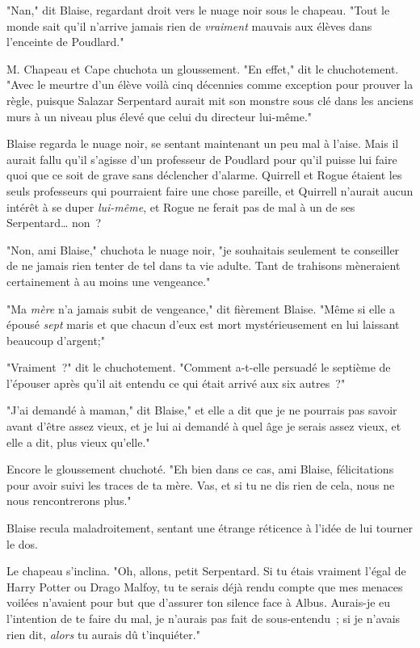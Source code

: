 "Nan," dit Blaise, regardant droit vers le nuage noir sous le chapeau. "Tout le monde sait qu'il n'arrive jamais rien de \emph{vraiment} mauvais aux élèves dans l'enceinte de Poudlard."

M. Chapeau et Cape chuchota un gloussement. "En effet," dit le chuchotement. "Avec le meurtre d'un élève voilà cinq décennies comme exception pour prouver la règle, puisque Salazar Serpentard aurait mit son monstre sous clé dans les anciens murs à un niveau plus élevé que celui du directeur lui-même."

Blaise regarda le nuage noir, se sentant maintenant un peu mal à l'aise. Mais il aurait fallu qu'il s'agisse d'un professeur de Poudlard pour qu'il puisse lui faire quoi que ce soit de grave sans déclencher d'alarme. Quirrell et Rogue étaient les seuls professeurs qui pourraient faire une chose pareille, et Quirrell n'aurait aucun intérêt à se duper \emph{lui-même}, et Rogue ne ferait pas de mal à un de ses Serpentard… non~?

"Non, ami Blaise," chuchota le nuage noir, "je souhaitais seulement te conseiller de ne jamais rien tenter de tel dans ta vie adulte. Tant de trahisons mèneraient certainement à au moins une vengeance."

"Ma \emph{mère} n'a jamais subit de vengeance," dit fièrement Blaise. "Même si elle a épousé \emph{sept} maris et que chacun d'eux est mort mystérieusement en lui laissant beaucoup d'argent;"

"Vraiment~?" dit le chuchotement. "Comment a-t-elle persuadé le septième de l'épouser après qu'il ait entendu ce qui était arrivé aux six autres~?"

"J'ai demandé à maman," dit Blaise," et elle a dit que je ne pourrais pas savoir avant d'être assez vieux, et je lui ai demandé à quel âge je serais assez vieux, et elle a dit, plus vieux qu'elle."

Encore le gloussement chuchoté. "Eh bien dans ce cas, ami Blaise, félicitations pour avoir suivi les traces de ta mère. Vas, et si tu ne dis rien de cela, nous ne nous rencontrerons plus."

Blaise recula maladroitement, sentant une étrange réticence à l'idée de lui tourner le dos.

Le chapeau s'inclina. "Oh, allons, petit Serpentard. Si tu étais vraiment l'égal de Harry Potter ou Drago Malfoy, tu te serais déjà rendu compte que mes menaces voilées n'avaient pour but que d'assurer ton silence face à Albus. Aurais-je eu l'intention de te faire du mal, je n'aurais pas fait de sous-entendu~; si je n'avais rien dit, \emph{alors} tu aurais dû t'inquiéter."

